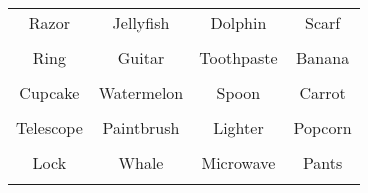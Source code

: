 \documentclass[12pt,a4paper]{article}
\begin{document}
\thispagestyle{empty}
\begin{table}[]
\centering
\Huge
\begin{tabular}{cccc}
 Razor& Jellyfish& Dolphin& Scarf\\  & & & \\
 Ring& Guitar& Toothpaste& Banana\\  & & & \\
 Cupcake& Watermelon& Spoon& Carrot\\  & & & \\
 Telescope& Paintbrush& Lighter& Popcorn\\  & & & \\
 Lock& Whale& Microwave& Pants\\  & & & \\
\end{tabular}
\end{table}
\end{document}
